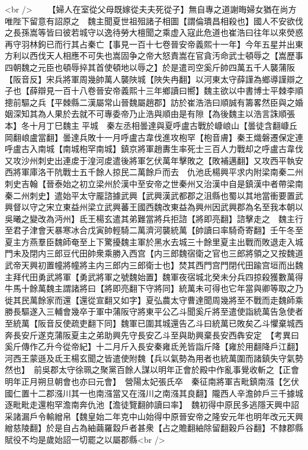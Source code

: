 <br />
　　【婦人在室從父母既嫁從夫夫死從子】無自專之道謝晦婦女猶在尚方唯陛下留意有詔原之　魏主聞夏世祖殂諸子相圖【謂倫璝昌相殺也】國人不安欲伐之長孫嵩等皆曰彼若城守以逸待勞大檀聞之乘虚入寇此危道也崔浩曰往年以來熒惑再守羽林鉤已而行其占秦亡【事見一百十七卷晉安帝義熙十一年】今年五星并出東方利以西伐天人相應不可失也嵩固争之帝大怒責嵩在官貪汚命武士頓辱之【嵩歷事四朝魏之元臣也頓辱捽其首使頓地以辱之】於是遣司空奚斤帥四萬五千人襲蒲阪【阪音反】宋兵將軍周幾帥萬人襲陜城【陜失冉翻】以河東太守薛謹為鄉導謹辯之子也【薛辯見一百十八卷晉安帝義熙十三年鄉讀曰嚮】魏主欲以中書博士平棘李順摠前驅之兵【平棘縣二漢屬常山晉魏屬趙郡】訪於崔浩浩曰順誠有籌畧然臣與之婚姻深知其為人果於去就不可專委帝乃止浩與順由是有隙【為後魏主以浩言誅順張本】冬十月丁巳魏主平城　秦左丞相曇達與夏呼盧古戰於嵻㟍山【曇徒含翻嵻丘岡翻㟍盧當翻】曇達兵敗十一月呼盧古韋伐進攻枹罕【枹音膚】秦王熾磐遷保定連呼盧古入南城【南城枹罕南城】鎮京將軍趙夀生率死士三百人力戰却之呼盧古韋伐又攻沙州刺史出連䖍于湟河䖍遣後將軍乞伏萬年擊敗之【敗補邁翻】又攻西平執安西將軍庫洛干阬戰士五千餘人掠民二萬餘戶而去　仇池氐楊興平求内附梁南秦二州刺史吉翰【晉泰始之初立梁州於漢中至安帝之世秦州又治漢中自是鎮漢中者帶梁南秦二州刺史】遣始平太守龎諮據武興【武興漢武都郡之沮縣也蜀以其地當衝要置武興督以守之宋立東益州梁立武興蕃王國西魏改東益為興州因武興郡為名至我本朝以吳曦之變改為沔州】氐王楊玄遣其弟難當將兵拒諮【將即亮翻】諮擊走之　魏主行至君子津會天暴寒冰合戊寅帥輕騎二萬濟河襲統萬【帥讀曰率騎奇寄翻】壬午冬至夏主方燕羣臣魏師奄至上下驚擾魏主軍於黑水去城三十餘里夏主出戰而敗退走入城門未及閉内三郎豆代田帥衆乘勝入西宫【内三郎魏宿衛之官也三郎將領之又按魏道武帝天興初置幢將幢將主内三郎内三郎衛士也】焚其西門宫門閉代田踰宫垣而出魏主拜代田勇武將軍【勇武將軍之號魏始置】魏軍夜宿城北癸未分兵四掠殺獲數萬得牛馬十餘萬魏主謂諸將曰【將即亮翻下守將同】統萬未可得也它年當與卿等取之乃徙其民萬餘家而還【還從宣翻又如字】夏弘農太守曹達聞周幾將至不戰而走魏師乘勝長驅遂入三輔會幾卒于軍中蒲阪守將東平公乙斗聞奚斤將至遣使詣統萬告急使者至統萬【阪音反使疏吏翻下同】魏軍已圍其城還告乙斗曰統萬已敗矣乙斗懼棄城西奔長安斤遂克蒲阪夏主之弟助興先守長安乙斗至與助興棄長安西犇安定　【考異曰奚斤傳作乙升今從帝紀】十二月斤入長安秦雍氐羌皆詣斤降【雍於用翻降戶江翻】河西王蒙遜及氐王楊玄聞之皆遣使附魏【兵以氣勢為用者也統萬圍而諸鎮失守氣勢然也】　前吳郡太守徐珮之聚黨百餘人謀以明年正會於殿中作亂事覺收斬之【正會明年正月朔旦朝會也亦曰元會】　營陽太妃張氏卒　秦征南將軍吉毗鎮南漒【乞伏國仁置十二郡漒川其一也南漒當又在漒川之南漒其良翻】隴西人辛澹帥戶三千據城逐毗毗走還枹罕澹南奔仇池【澹徒覽翻帥讀曰率】　魏初得中原民多逃隱天興中詔采諸漏戶令輸繒帛【魏皇始二年克中山始得中原晉安帝之隆安元年也明年改元天興繒慈陵翻】於是自占為紬繭羅縠戶者甚衆【占之贍翻紬除留翻穀戶谷翻】不隸郡縣賦役不均是歲始詔一切罷之以屬郡縣<br />
